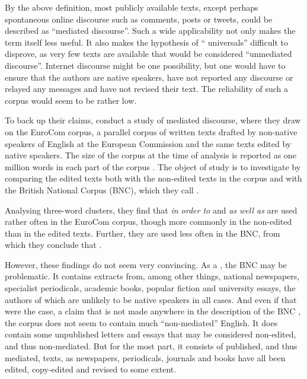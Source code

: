 \documentclass[output=paper]{LSP/langsci}
\begin{document}
By the above definition, most publicly available texts, except perhaps spontaneous online discourse such as comments, posts or tweets, could be described as \enquote{mediated discourse}. Such a wide applicability not only makes the term itself less useful. It also makes the hypothesis of \enquote{ universals} difficult to disprove, as very few texts are available that would be considered \enquote{unmediated discourse}. Internet discourse might be one possibility, but one would have to ensure that the authors are native speakers, have not reported any discourse or relayed any messages and have not revised their text. The reliability of such a corpus would seem to be rather low.

To back up their claims, \textcite{ulrmur08} conduct a study of mediated discourse, where they draw on the EuroCom corpus, a parallel corpus of written texts drafted by non-native speakers of English at the European Commission and the same texts edited by native speakers. The size of the corpus at the time of analysis is reported as one million words in each part of the corpus \parencite[152]{ulrmur08}. The object of study is to investigate  by comparing the edited texts both with the non-edited texts in the corpus and with the British National Corpus (BNC), which they call .

Analysing three-word clusters, they find that \emph{in order to} and \emph{as well as} are used rather often in the EuroCom corpus, though more commonly in the non-edited than in the edited texts. Further, they are used less often in the BNC, from which they conclude that .

However, these findings do not seem very convincing. As a , the BNC may be problematic. It contains extracts from, among other things, national newspapers, specialist periodicals, academic books, popular fiction and university essays, the authors of which are unlikely to be native speakers in all cases. And even if that were the case, a claim that is not made anywhere in the description of the BNC \parencite{bnc09}, the corpus does not seem to contain much \enquote{non-mediated} English. It does contain some unpublished letters and essays that may be considered non-edited, and thus non-mediated. But for the most part, it consists of published, and thus mediated, texts, as newspapers, periodicals, journals and books have all been edited, copy-edited and revised to some extent.
\end{document}
